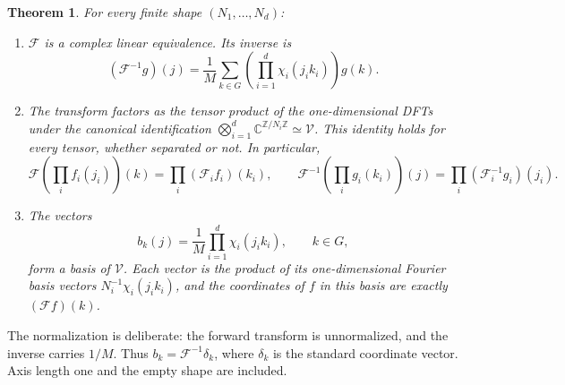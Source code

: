 \documentclass[11pt]{article}
\newtheorem{theorem}{Theorem}
\newcommand{\C}{\mathbb C}
\newcommand{\Z}{\mathbb Z}
\newcommand{\F}{\mathcal F}
\begin{document}
\begin{theorem}\label{thm:main}
For every finite shape $(N_1,\ldots,N_d)$:
\begin{enumerate}
\item $\F$ is a complex linear equivalence. Its inverse is
\[
(\F^{-1}g)(j)=\frac1M\sum_{k\in G}
  \left(\prod_{i=1}^d\chi_i(j_i k_i)\right)g(k).
\]
\item The transform factors as the tensor product of the
one-dimensional DFTs under the canonical identification
$\bigotimes_{i=1}^d\C^{\Z/N_i\Z}\simeq\mathcal V$.
This identity holds for every tensor, whether separated or not.
In particular,
\[
\F\left(\prod_i f_i(j_i)\right)(k)
=\prod_i(\F_i f_i)(k_i),
\qquad
\F^{-1}\left(\prod_i g_i(k_i)\right)(j)
=\prod_i(\F_i^{-1}g_i)(j_i).
\]
\item The vectors
\[
b_k(j)=\frac1M\prod_{i=1}^d\chi_i(j_i k_i),\qquad k\in G,
\]
form a basis of $\mathcal V$. Each vector is the product of its
one-dimensional Fourier basis vectors
$N_i^{-1}\chi_i(j_i k_i)$, and the coordinates of $f$ in this basis
are exactly $(\F f)(k)$.
\end{enumerate}
\end{theorem}

The normalization is deliberate: the forward transform is unnormalized,
and the inverse carries $1/M$. Thus $b_k=\F^{-1}\delta_k$, where
$\delta_k$ is the standard coordinate vector. Axis length one and the
empty shape are included.
\end{document}

